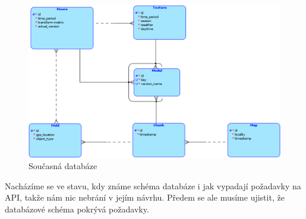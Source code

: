 \documentclass[thesis=B,czech]{FITthesis}[2012/06/26]
\begin{document}
    \begin{figure}[h!] \label{soucasnaDB}
        \includegraphics[width=\linewidth]{contemporary_database}
        \caption{Současná databáze}
    \end{figure}
    \newpage
    Nacházíme se ve stavu, kdy známe schéma databáze i jak vypadají požadavky na API, takže nám nic nebrání v jejím návrhu. Předem se ale musíme ujistit, že databázové schéma pokrývá požadavky.
    
\end{document}
